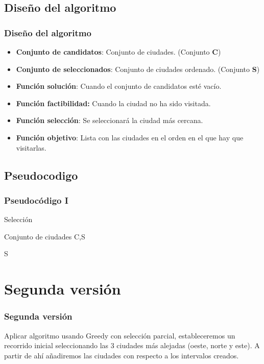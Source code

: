 \documentclass{beamer}
\begin{document}
\subsection{Diseño del algoritmo} 
\begin{frame}
	\frametitle{Diseño del algoritmo}
	\begin{itemize}
		\item \textbf{Conjunto de candidatos}: Conjunto de ciudades. (Conjunto \textbf{C})
		\item \textbf{Conjunto de seleccionados}: Conjunto de ciudades ordenado. (Conjunto \textbf{S})
		\item \textbf{Función solución}: Cuando el conjunto de candidatos esté vacío.
		\item \textbf{Función factibilidad:} Cuando la ciudad no ha sido visitada.
		\item \textbf{Función selección}: Se seleccionará la ciudad más cercana.
		\item \textbf{Función objetivo}: Lista con las ciudades en el orden en el que hay que visitarlas.		
	\end{itemize}
	
\end{frame}

\subsection{Pseudocodigo}
\begin{frame}
	\frametitle{Pseudocódigo I}
	Selección

	\begin{algorithmic}
	\Require Conjunto de ciudades C,S
		\EndIf
	\EndFor  
	
	\Return S	
	\end{algorithmic}	
\end{frame}


\section{Segunda versión} 
\begin{frame}
	\frametitle{Segunda versión}
	Aplicar algoritmo usando Greedy con selección parcial, estableceremos un recorrido inicial seleccionando las 3 ciudades más alejadas (oeste, norte y este). A partir de ahí añadiremos las ciudades con respecto a los intervalos creados.
	
\end{frame}
\end{document}
